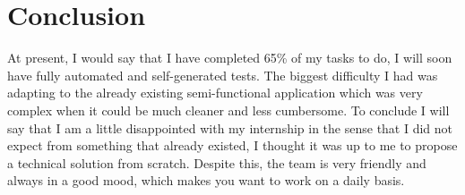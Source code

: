 \section{Conclusion}
At present, I would say that I have completed 65\% of my tasks to do, I will soon have
fully automated and self-generated tests. The biggest difficulty I had was adapting to the
already existing semi-functional application which was very complex when it could be much
cleaner and less cumbersome.
To conclude I will say that I am a little disappointed with my internship in the sense that
I did not expect from something that already existed, I thought it was up to me to propose a
technical solution from scratch.
Despite this, the team is very friendly and always in a good mood, which makes you want to
work on a daily basis.